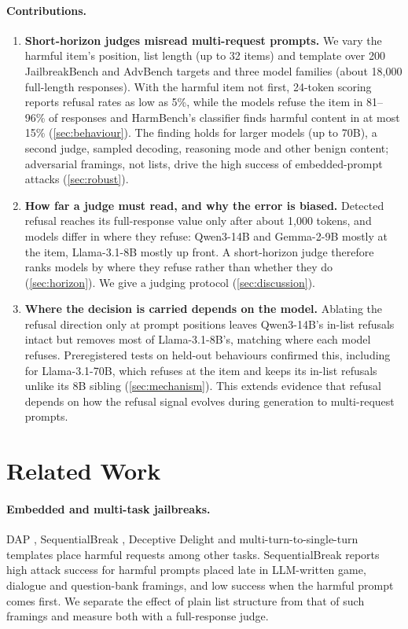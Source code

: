 \paragraph{Contributions.}
\begin{enumerate}[leftmargin=*,itemsep=1pt,topsep=2pt]
\item \textbf{Short-horizon judges misread multi-request prompts.} We vary the harmful item's position, list
length (up to 32 items) and template over 200 JailbreakBench and AdvBench targets and three model families
(about 18{,}000 full-length responses). With the harmful item not first, 24-token scoring reports refusal rates
as low as 5\%, while the models refuse the item in 81--96\% of responses and HarmBench's classifier finds harmful
content in at most 15\% (\cref{sec:behaviour}). The finding holds for larger models (up to 70B), a second judge,
sampled decoding, reasoning mode and other benign content; adversarial framings, not lists, drive the high
success of embedded-prompt attacks (\cref{sec:robust}).
\item \textbf{How far a judge must read, and why the error is biased.} Detected refusal reaches its
full-response value only after about 1{,}000 tokens, and models differ in where they refuse: Qwen3-14B and
Gemma-2-9B mostly at the item, Llama-3.1-8B mostly up front. A short-horizon judge therefore ranks models by where
they refuse rather than whether they do (\cref{sec:horizon}). We give a judging protocol (\cref{sec:discussion}).
\item \textbf{Where the decision is carried depends on the model.} Ablating the refusal direction
\citep{arditi2024refusal} only at prompt positions leaves Qwen3-14B's in-list refusals intact but removes most of
Llama-3.1-8B's, matching where each model refuses. Preregistered tests on held-out behaviours confirmed this, including
for Llama-3.1-70B, which refuses at the item and keeps its in-list refusals unlike its 8B sibling
(\cref{sec:mechanism}). This extends evidence that refusal depends on how the refusal signal evolves during
generation \citep{dahiya2026suppress,yamaguchi2025reasoning} to multi-request prompts.
\end{enumerate}

\section{Related Work}
\label{sec:related}

\paragraph{Embedded and multi-task jailbreaks.} DAP \citep{xiao2024dap}, SequentialBreak
\citep{saiem2024sequentialbreak}, Deceptive Delight \citep{unit42deceptive} and multi-turn-to-single-turn
templates \citep{kim2025m2s} place harmful requests among other tasks. SequentialBreak reports high attack
success for harmful prompts placed late in LLM-written game, dialogue and question-bank framings, and low
success when the harmful prompt comes first. We separate the effect of plain list structure from that of such
framings and measure both with a full-response judge.

